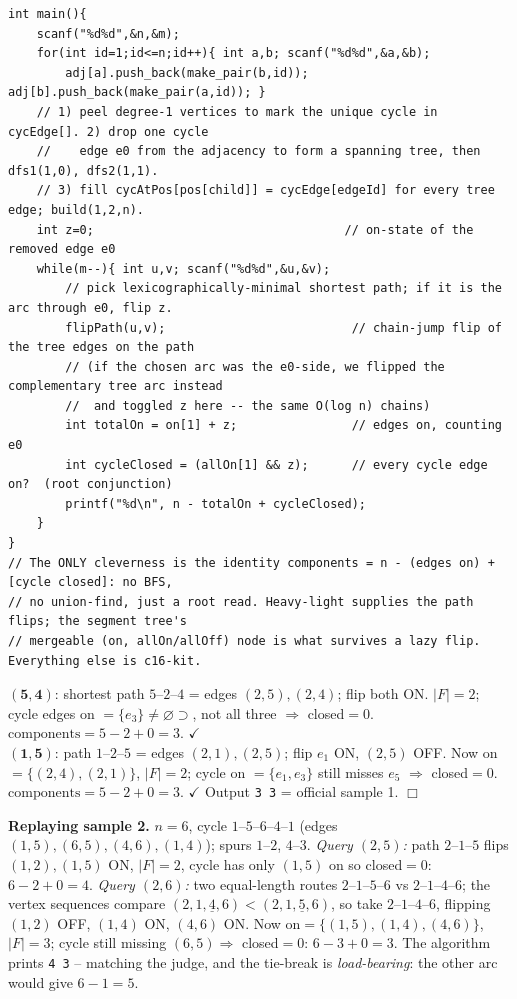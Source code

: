 \begin{lstlisting}
int main(){
    scanf("%d%d",&n,&m);
    for(int id=1;id<=n;id++){ int a,b; scanf("%d%d",&a,&b);
        adj[a].push_back(make_pair(b,id)); adj[b].push_back(make_pair(a,id)); }
    // 1) peel degree-1 vertices to mark the unique cycle in cycEdge[]. 2) drop one cycle
    //    edge e0 from the adjacency to form a spanning tree, then dfs1(1,0), dfs2(1,1).
    // 3) fill cycAtPos[pos[child]] = cycEdge[edgeId] for every tree edge; build(1,2,n).
    int z=0;                                   // on-state of the removed edge e0
    while(m--){ int u,v; scanf("%d%d",&u,&v);
        // pick lexicographically-minimal shortest path; if it is the arc through e0, flip z.
        flipPath(u,v);                          // chain-jump flip of the tree edges on the path
        // (if the chosen arc was the e0-side, we flipped the complementary tree arc instead
        //  and toggled z here -- the same O(log n) chains)
        int totalOn = on[1] + z;                // edges on, counting e0
        int cycleClosed = (allOn[1] && z);      // every cycle edge on?  (root conjunction)
        printf("%d\n", n - totalOn + cycleClosed);
    }
}
// The ONLY cleverness is the identity components = n - (edges on) + [cycle closed]: no BFS,
// no union-find, just a root read. Heavy-light supplies the path flips; the segment tree's
// mergeable (on, allOn/allOff) node is what survives a lazy flip. Everything else is c16-kit.
\end{lstlisting}

\begin{tracebox}[Sample 1: \(n=5\), cycle \(1\text{--}2\text{--}4\text{--}1\) (edges \(e_1,e_3,e_5\))]
\(\mathbf{(5,4)}\): shortest path \(5\text{--}2\text{--}4\) = edges \((2,5),(2,4)\); flip both ON.
\(|F|=2\); cycle edges on \(=\{e_3\}\neq\varnothing\!\!\supset\), not all three \(\Rightarrow\) closed\(=0\).
\(\text{components}=5-2+0=\boxed{3}\). \(\checkmark\)\\
\(\mathbf{(1,5)}\): path \(1\text{--}2\text{--}5\) = edges \((2,1),(2,5)\); flip \(e_1\) ON,
\((2,5)\) OFF. Now on \(=\{(2,4),(2,1)\}\), \(|F|=2\); cycle on \(=\{e_1,e_3\}\) still misses
\(e_5\) \(\Rightarrow\) closed\(=0\). \(\text{components}=5-2+0=\boxed{3}\). \(\checkmark\) Output
\texttt{3 3} = official sample 1. \(\Box\)
\end{tracebox}

\noindent\textbf{Replaying sample 2.} \(n=6\), cycle \(1\text{--}5\text{--}6\text{--}4\text{--}1\)
(edges \((1,5),(6,5),(4,6),(1,4)\)); spurs \(1\text{--}2\), \(4\text{--}3\).
\emph{Query \((2,5)\):} path \(2\text{--}1\text{--}5\) flips \((1,2),(1,5)\) ON, \(|F|=2\), cycle
has only \((1,5)\) on so closed\(=0\): \(6-2+0=\boxed{4}\). \emph{Query \((2,6)\):} two
equal-length routes \(2\text{--}1\text{--}5\text{--}6\) vs \(2\text{--}1\text{--}4\text{--}6\);
the vertex sequences compare \((2,1,\underline{4},6)<(2,1,\underline{5},6)\), so take
\(2\text{--}1\text{--}4\text{--}6\), flipping \((1,2)\) OFF, \((1,4)\) ON, \((4,6)\) ON. Now
on\(=\{(1,5),(1,4),(4,6)\}\), \(|F|=3\); cycle still missing \((6,5)\Rightarrow\) closed\(=0\):
\(6-3+0=\boxed{3}\). The algorithm prints \texttt{4 3} -- matching the judge, and the tie-break is
\emph{load-bearing}: the other arc would give \(6-1=5\).

